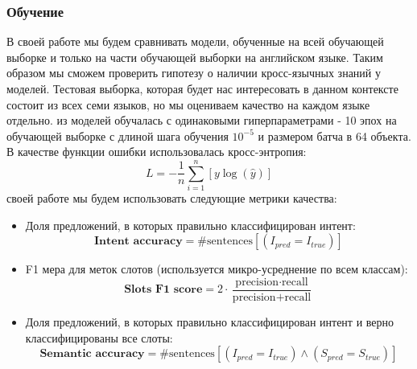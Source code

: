 \subsubsection{Обучение}
В своей работе мы будем сравнивать модели, обученные на всей обучающей выборке и только на части обучающей выборки на английском языке.
Таким образом мы сможем проверить гипотезу о наличии кросс-язычных знаний у моделей.
Тестовая выборка, которая будет нас интересовать в данном контексте состоит из всех семи языков, но мы оцениваем качество на каждом языке отдельно.
 из моделей обучалась с одинаковыми гиперпараметрами - 10 эпох на обучающей выборке с длиной шага обучения $10^{-5}$ и размером батча в 64 объекта.
В качестве функции ошибки использовалась кросс-энтропия:
\begin{equation}
    L = -\dfrac{1}{n}\sum\limits_{i = 1}^{n}\left[ y\log\left(\hat{y}\right) \right]\label{eq:equation4}
\end{equation}
 своей работе мы будем использовать следующие метрики качества:
\begin{itemize}
    \item Доля предложений, в которых правильно классифицирован интент:
    \begin{equation}
        \textbf{Intent accuracy} = \# \text{sentences} \left[ \left(I_{pred} = I_{true} \right) \right]\label{eq:equation}
    \end{equation}
    \item F1 мера для меток слотов (используется микро-усреднение по всем классам):
    \begin{equation}
        \textbf{Slots F1 score} = 2 \cdot \dfrac{\text{precision} \cdot \text{recall}}{\text{precision} + \text{recall}}\label{eq:equation2}
    \end{equation}
    \item Доля предложений, в которых правильно классифицирован интент и верно классифицированы все слоты:
    \begin{equation}
        \textbf{Semantic accuracy} = \# \text{sentences} \left[ \left(I_{pred} = I_{true} \right) \land \left(S_{pred} = S_{true} \right)\right]\label{eq:equation3}
    \end{equation}
\end{itemize}

